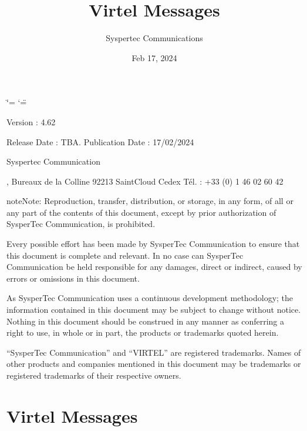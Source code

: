 \documentclass[letterpaper,10pt,english]{sphinxmanual}
\title{Virtel Messages}
\date{Feb 17, 2024}
\author{Syspertec Communications}
\begin{document}
\ifdefined\shorthandoff
  \ifnum\catcode`\=\string=\active\shorthandoff{=}\fi
  \ifnum\catcode`\"=\active{}\fi
\fi

\pagestyle{empty}
\sphinxmaketitle
\pagestyle{plain}
\sphinxtableofcontents
\pagestyle{normal}
\label{\detokenize{messages::doc}}


\sphinxAtStartPar
{}

\sphinxAtStartPar
{}

\sphinxAtStartPar
Version : 4.62

\sphinxAtStartPar
Release Date : TBA. Publication Date : 17/02/2024

\sphinxAtStartPar
Syspertec Communication

, Bureaux de la Colline 92213 Saint\sphinxhyphen{}Cloud Cedex Tél. : +33 (0) 1 46 02 60 42

\sphinxAtStartPar
{}

\begin{sphinxadmonition}{note}{Note:}
\sphinxAtStartPar
Reproduction, transfer, distribution, or storage, in any form, of all or any part of
the contents of this document, except by prior authorization of SysperTec
Communication, is prohibited.

\sphinxAtStartPar
Every possible effort has been made by SysperTec Communication to ensure that this document
is complete and relevant. In no case can SysperTec Communication be held responsible for
any damages, direct or indirect, caused by errors or omissions in this document.

\sphinxAtStartPar
As SysperTec Communication uses a continuous development methodology; the information
contained in this document may be subject to change without notice. Nothing in this
document should be construed in any manner as conferring a right to use, in whole or in
part, the products or trademarks quoted herein.

\sphinxAtStartPar
“SysperTec Communication” and “VIRTEL” are registered trademarks. Names of other products
and companies mentioned in this document may be trademarks or registered trademarks of
their respective owners.
\end{sphinxadmonition}


\chapter{Virtel Messages}
\label{\detokenize{messages:virtel-messages}}\label{\detokenize{messages:v462mg-introduction}}
\end{document}
